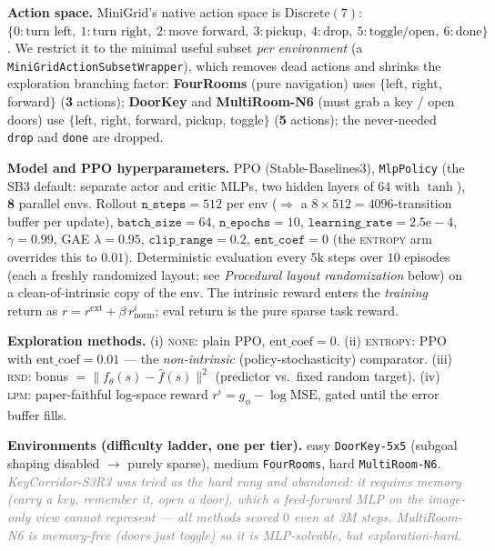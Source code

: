 \documentclass[11pt]{article}
\newcommand{\note}[1]{\textcolor{gray}{\small\emph{#1}}}
\begin{document}
\textbf{Action space.} MiniGrid's native action space is $\mathrm{Discrete}(7)$:
$\{0\!:\!\text{turn left},\ 1\!:\!\text{turn right},\ 2\!:\!\text{move forward},\ 3\!:\!\text{pickup},\
4\!:\!\text{drop},\ 5\!:\!\text{toggle/open},\ 6\!:\!\text{done}\}$. We restrict it to the minimal
useful subset \emph{per environment} (a \texttt{MiniGridActionSubsetWrapper}), which removes dead
actions and shrinks the exploration branching factor: \textbf{FourRooms} (pure navigation) uses
$\{$left, right, forward$\}$ (\textbf{3} actions); \textbf{DoorKey} and \textbf{MultiRoom-N6} (must
grab a key / open doors) use $\{$left, right, forward, pickup, toggle$\}$ (\textbf{5} actions); the
never-needed \texttt{drop} and \texttt{done} are dropped.

\textbf{Model and PPO hyperparameters.} PPO (Stable-Baselines3), \texttt{MlpPolicy} (the SB3 default:
separate actor and critic MLPs, two hidden layers of $64$ with $\tanh$), $\mathbf{8}$ parallel envs.
Rollout $\texttt{n\_steps}{=}512$ per env ($\Rightarrow$ a $8\!\times\!512{=}4096$-transition buffer
per update), $\texttt{batch\_size}{=}64$, $\texttt{n\_epochs}{=}10$, $\texttt{learning\_rate}{=}2.5\mathrm{e}{-}4$,
$\gamma{=}0.99$, GAE $\lambda{=}0.95$, $\texttt{clip\_range}{=}0.2$, $\texttt{ent\_coef}{=}0$ (the
\textsc{entropy} arm overrides this to $0.01$). Deterministic evaluation every $5\mathrm{k}$ steps over
$10$ episodes (each a freshly randomized layout; see \emph{Procedural layout randomization} below) on a
clean-of-intrinsic copy of the env. The intrinsic reward enters the \emph{training}
return as $r = r^{\text{ext}} + \beta\,r^{i}_{\text{norm}}$; eval return is the pure sparse task reward.

\textbf{Exploration methods.} (i) \textsc{none}: plain PPO, $\mathrm{ent\_coef}{=}0$. (ii)
\textsc{entropy}: PPO with $\mathrm{ent\_coef}{=}0.01$ --- the \emph{non-intrinsic} (policy-stochasticity)
comparator. (iii) \textsc{rnd}: bonus $=\lVert f_\theta(s)-\hat f(s)\rVert^2$ (predictor vs.\ fixed
random target). (iv) \textsc{lpm}: paper-faithful log-space reward $r^i=g_\phi-\log\mathrm{MSE}$, gated
until the error buffer fills.

\textbf{Environments (difficulty ladder, one per tier).} easy \texttt{DoorKey-5x5} (subgoal shaping
disabled $\to$ purely sparse), medium \texttt{FourRooms}, hard \texttt{MultiRoom-N6}.
\note{KeyCorridor-S3R3 was tried as the hard rung and abandoned: it requires \emph{memory} (carry a
key, remember it, open a door), which a feed-forward MLP on the image-only view cannot represent ---
all methods scored $0$ even at 3M steps. MultiRoom-N6 is memory-free (doors just toggle) so it is
MLP-solvable, but exploration-hard.}
\end{document}
